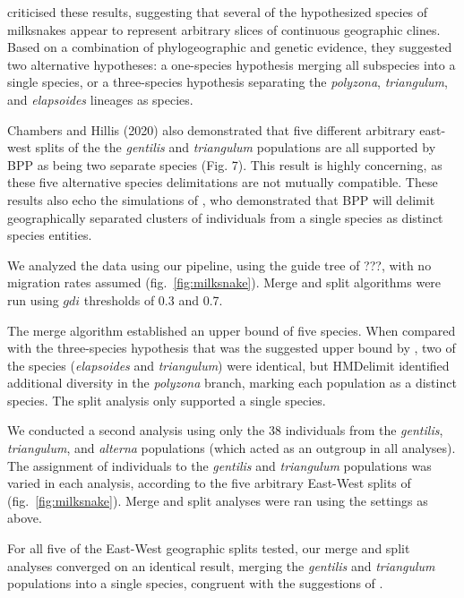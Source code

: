 \documentclass[A4]{article1}
\begin{document}
\citet{Chambers2020} criticised these results, suggesting that several of the
hypothesized species of milksnakes appear to represent arbitrary slices of continuous
geographic clines.  Based on a combination of phylogeographic and genetic evidence, they
suggested two alternative hypotheses: a one-species hypothesis merging all subspecies into
a single species, or a three-species hypothesis separating the \textit{polyzona},
\textit{triangulum}, and \textit{elapsoides} lineages as species. 

Chambers and Hillis (2020) also demonstrated that
five different arbitrary east-west splits of the the
\textit{gentilis} and \textit{ triangulum} populations are all supported
by BPP as being two separate species (Fig. 7). This
result is highly concerning, as these five alternative
species delimitations are not mutually compatible.
These results also echo the simulations of \cite{Barley2018}, who demonstrated that BPP will delimit
geographically separated clusters of individuals from
a single species as distinct species entities.

We analyzed the data using our pipeline, using the guide tree of ???, with no migration
rates assumed (fig.~\ref{fig:milksnake}).  Merge and split algorithms were run using $gdi$
thresholds of 0.3 and 0.7.

The merge algorithm established an upper bound of five species.  When compared with the
three-species hypothesis that was the suggested upper bound by \citet{Chambers2020}, two
of the species (\textit{elapsoides} and \textit{triangulum}) were identical, but
HMDelimit identified additional diversity in the \textit{polyzona} branch, marking each
population as a distinct species.  The split analysis only supported a single species.

We conducted a second analysis using only the 38 individuals from the \textit{gentilis},
\textit{triangulum}, and \textit{alterna} populations (which acted as an outgroup in all
analyses).  The assignment of individuals to the \textit{gentilis} and \textit{triangulum}
populations was varied in each analysis, according to the five arbitrary East-West splits of \cite{Chambers2020} (fig.~\ref{fig:milksnake}). Merge and split analyses were ran using the settings as above.  

For all five of the East-West geographic splits tested, our merge and split analyses converged on an identical result,
merging the \textit{gentilis} and \textit{triangulum} populations into a single species, congruent with the suggestions of \cite{Chambers2020}.
\end{document}
